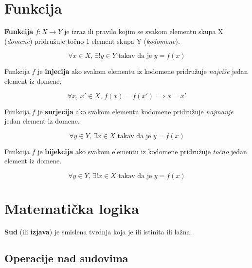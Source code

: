 \section{Funkcija}

\begin{definition}[funkcija]
    \textbf{Funkcija} $f: X \to Y$ je izraz ili pravilo kojim se svakom elementu
    skupa X (\textit{domene}) pridružuje točno 1 element skupa Y
    (\textit{kodomene}).

    $$
        \forall x \in X,\, \exists! y \in Y \text{ takav da je } y = f(x)
    $$
\end{definition}

\begin{definition}[injecija]
    Funkcija $f$ je \textbf{injecija} ako svakom elementu iz kodomene pridružuje
    \textit{najviše} jedan element iz domene.

    $$
        \forall x,\, x' \in X,\, f(x) = f(x') \implies x = x'
    $$
\end{definition}

\begin{definition}[surjecija]
    Funkcija $f$ je \textbf{surjecija} ako svakom elementu kodomene pridružuje
    \textit{najmanje} jedan element iz domene.

    $$
        \forall y \in Y,\, \exists x \in X \text{ takav da je } y = f(x)
    $$
\end{definition}

\begin{definition}[bijekcija]
    Funkcija $f$ je \textbf{bijekcija} ako svakom elementu iz kodomene pridružuje
    \textit{točno} jedan element iz domene.

    $$
        \forall y \in Y,\, \exists! x \in X \text{ takav da je } y = f(x)
    $$
\end{definition}

\section{Matematička logika}

\begin{definition}[sud]
    \textbf{Sud} (ili \textbf{izjava}) je smislena tvrdnja koja je ili istinita ili lažna.
\end{definition}

\subsection{Operacije nad sudovima}

